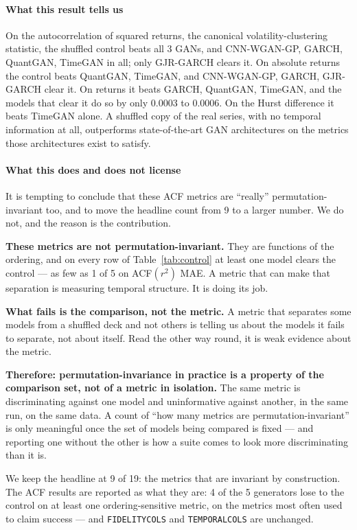 \documentclass[11pt,a4paper]{article}
\makeatletter
\DeclareRobustCommand{\_}{\ifmmode\nfss@text{\textunderscore}\else\textunderscore\allowbreak\fi}
\makeatother
\begin{document}
\paragraph{What this result tells us} On the autocorrelation of squared returns, the canonical volatility-clustering statistic, the shuffled control beats all 3 GANs, and CNN-WGAN-GP, GARCH, QuantGAN, TimeGAN in all; only GJR-GARCH clears it. On absolute returns the control beats QuantGAN, TimeGAN, and CNN-WGAN-GP, GARCH, GJR-GARCH clear it. On returns it beats GARCH, QuantGAN, TimeGAN, and the models that clear it do so by only 0.0003 to 0.0006. On the Hurst difference it beats TimeGAN alone. A shuffled copy of the real series, with no temporal information at all, outperforms state-of-the-art GAN architectures on the metrics those architectures exist to satisfy.

\paragraph{What this does and does not license} It is tempting to conclude that these ACF metrics are ``really'' permutation-invariant too, and to move the headline count from 9 to a larger number. We do not, and the reason is the contribution.

\textbf{These metrics are not permutation-invariant.} They are functions of the ordering, and on every row of Table~\ref{tab:control} at least one model clears the control --- as few as 1 of 5 on ACF$(r^2)$ MAE. A metric that can make that separation is measuring temporal structure. It is doing its job.

\textbf{What fails is the comparison, not the metric.} A metric that separates some models from a shuffled deck and not others is telling us about the models it fails to separate, not about itself. Read the other way round, it is weak evidence about the metric.

\textbf{Therefore: permutation-invariance in practice is a property of the comparison set, not of a metric in isolation.} The same metric is discriminating against one model and uninformative against another, in the same run, on the same data. A count of ``how many metrics are permutation-invariant'' is only meaningful once the set of models being compared is fixed --- and reporting one without the other is how a suite comes to look more discriminating than it is.

We keep the headline at 9 of 19: the metrics that are invariant by construction. The ACF results are reported as what they are: 4 of the 5 generators lose to the control on at least one ordering-sensitive metric, on the metrics most often used to claim success --- and \texttt{FIDELITY\_COLS} and \texttt{TEMPORAL\_COLS} are unchanged.
\end{document}
